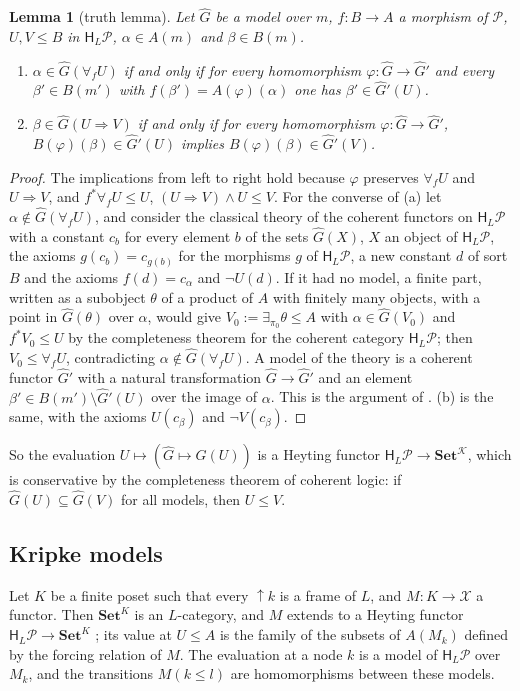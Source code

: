 \documentclass[11pt]{amsart}
\newtheorem{lem}[thm]{Lemma}
\theoremstyle{definition}
\newcommand{\Set}{\mathbf{Set}}
\newcommand{\HH}{\mathsf H}
\newcommand{\cX}{\mathcal X}
\newcommand{\cP}{\mathcal P}
\newcommand{\cK}{\mathcal K}
\begin{document}
\begin{lem}[truth lemma]\label{lem:truth}
Let $\hat G$ be a model over $m$, $f\colon B\to A$ a morphism of $\cP$,
$U,V\le B$ in $\HH_L\cP$, $\alpha\in A(m)$ and $\beta\in B(m)$.
\begin{enumerate}
\item[(a)] $\alpha\in\hat G(\forall_fU)$ if and only if for every
homomorphism $\varphi\colon\hat G\to\hat G'$ and every $\beta'\in
B(m')$ with $f(\beta')=A(\varphi)(\alpha)$ one has $\beta'\in\hat
G'(U)$.
\item[(b)] $\beta\in\hat G(U\Rightarrow V)$ if and only if for every
homomorphism $\varphi\colon\hat G\to\hat G'$, $B(\varphi)(\beta)\in
\hat G'(U)$ implies $B(\varphi)(\beta)\in\hat G'(V)$.
\end{enumerate}
\end{lem}
\begin{proof}
The implications from left to right hold because $\varphi$ preserves
$\forall_fU$ and $U\Rightarrow V$, and $f^*\forall_fU\le U$,
$(U\Rightarrow V)\wedge U\le V$. For the converse of (a) let
$\alpha\notin\hat G(\forall_fU)$, and consider the classical theory of
the coherent functors on $\HH_L\cP$ with a constant $c_b$ for every
element $b$ of the sets $\hat G(X)$, $X$ an object of $\HH_L\cP$, the
axioms $g(c_b)=c_{g(b)}$ for the morphisms $g$ of $\HH_L\cP$, a new
constant $d$ of sort $B$ and the axioms $f(d)=c_\alpha$ and $\neg
U(d)$. If it had no model, a finite part, written as a subobject
$\theta$ of a product of $A$ with finitely many objects, with a point
in $\hat G(\theta)$ over $\alpha$, would give $V_0:=\exists_{\pi_0}
\theta\le A$ with $\alpha\in\hat G(V_0)$ and $f^*V_0\le U$ by the
completeness theorem for the coherent category $\HH_L\cP$; then
$V_0\le\forall_fU$, contradicting $\alpha\notin\hat G(\forall_fU)$. A
model of the theory is a coherent functor $\hat G'$ with a natural
transformation $\hat G\to\hat G'$ and an element $\beta'\in B(m')
\setminus\hat G'(U)$ over the image of $\alpha$. This is the argument
of \cite[Lemma~7.13]{Heyting}. (b) is the same, with the axioms
$U(c_\beta)$ and $\neg V(c_\beta)$.
\end{proof}

So the evaluation $U\mapsto(\hat G\mapsto\hat G(U))$ is a Heyting
functor $\HH_L\cP\to\Set^{\cK}$, which is conservative by the
completeness theorem of coherent logic: if $\hat G(U)\subseteq\hat
G(V)$ for all models, then $U\le V$.

\subsection*{Kripke models}
Let $K$ be a finite poset such that every $\uparrow\!k$ is a frame of
$L$, and $M\colon K\to\cX$ a functor. Then $\Set^K$ is an $L$-category,
and $M$ extends to a Heyting functor $\HH_L\cP\to\Set^K$
\cite[Lemma~2.3]{Interm}; its value at $U\le A$ is the family of the
subsets of $A(M_k)$ defined by the forcing relation of $M$. The
evaluation at a node $k$ is a model of $\HH_L\cP$ over $M_k$, and the
transitions $M(k\le l)$ are homomorphisms between these models.
\end{document}
